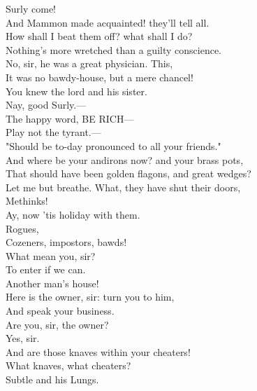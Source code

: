 \documentclass[a4paper,oneside]{memoir}
\begin{document}
\begin{drama*}
\facespeaks {} Surly come!\\
And Mammon made acquainted! they'll tell all.\\
How shall I beat them off? what shall I do?\\
Nothing's more wretched than a guilty conscience.\\
\surlyspeaks No, sir, he was a great physician. This,\\
It was no bawdy-house, but a mere chancel!\\
You knew the lord and his sister.\\
\mammonspeaks {} Nay, good Surly.---\\
\surlyspeaks The happy word, BE RICH---\\
\mammonspeaks {} Play not the tyrant.---\\
\surlyspeaks "Should be to-day pronounced to all your friends."\\
And where be your andirons now? and your brass pots,\\
That should have been golden flagons, and great wedges?\\
\mammonspeaks Let me but breathe. What, they have shut their doors,\\
Methinks!\\
\surlyspeaks {} Ay, now 'tis holiday with them.\\
\mammonspeaks Rogues,\\
Cozeners, impostors, bawds!\\
\facespeaks {} What mean you, sir?\\
\mammonspeaks To enter if we can.\\
\facespeaks {} Another man's house!\\
Here is the owner, sir: turn you to him,\\
And speak your business.\\
\mammonspeaks {} Are you, sir, the owner?\\
\lovewitspeaks Yes, sir.\\
\mammonspeaks {} And are those knaves within your cheaters!\\
\lovewitspeaks What knaves, what cheaters?\\
\mammonspeaks {} Subtle and his Lungs.\\

\end{drama*}
\end{document}
